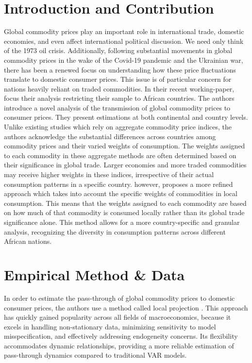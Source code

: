 \documentclass[11pt]{article}
\begin{document}
	\pagebreak
	\setcounter{page}{1}
	\begin{spacing}{2}
		\section{Introduction and Contribution}
		Global commodity prices play an important role in international trade, domestic economies, and even affect international political discussion. We need only think of the 1973 oil crisis. Additionally, following substantial movements in global commodity prices in the wake of the Covid-19 pandemic and the Ukrainian war, there has been a renewed focus on understanding how these price fluctuations translate to domestic consumer prices. This issue is of particular concern for nations heavily reliant on traded commodities.
		In their recent working-paper, \cite{lemaire2023international} focus their analysis restricting their sample to African countries. The authors introduce a novel analysis of the transmission of global commodity prices to consumer prices. They present estimations at both continental and country levels. Unlike existing studies which rely on aggregate commodity price indices, the authors acknowledge the substantial differences across countries among commodity prices and their varied weights of consumption. The weights assigned to each commodity in these aggregate methods are often determined based on their significance in global trade. Larger economies and more traded commodities may receive higher weights in these indices, irrespective of their actual consumption patterns in a specific country. \cite{lemaire2023international} however, proposes a more refined approach which takes into account the specific weights of commodities in local consumption. This means that the weights assigned to each commodity are based on how much of that commodity is consumed locally rather than its global trade significance alone. This method allows for a more country-specific and granular analysis, recognizing the diversity in consumption patterns across different African nations. 
		
		\section{Empirical Method \& Data }
		In order to estimate the pass-through of global commodity prices to domestic consumer prices, the authors use a method called local projection \parencite{jorda2005estimation}. This approach has quickly gained popularity across all fields of macroeconomics, because it excels in handling non-stationary data, minimizing sensitivity to model misspecification, and effectively addressing endogeneity concerns. Its flexibility accommodates dynamic relationships, providing a more reliable estimation of pass-through dynamics compared to traditional VAR models.
		


\end{spacing}
\end{document}
